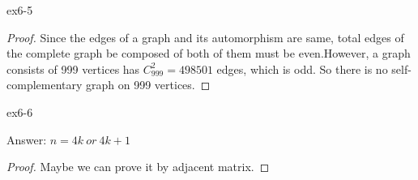 \begin{exercise}
ex6-5
\end{exercise}

\begin{proof}
Since the edges of a graph and its automorphism are same, total edges of the complete graph be composed of both of them must be even.However, a graph consists of 999 vertices has $C_{999}^2=498501$ edges, which is odd. So there is no self-complementary graph on 999 vertices.
\end{proof}

\begin{exercise}
ex6-6
\end{exercise}

Answer: $n=4k\: or\: 4k+1$
\begin{proof}
Maybe we can prove it by adjacent matrix.
\end{proof}
